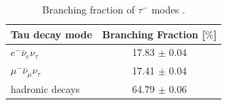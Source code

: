 %  
  \begin{table}[ht]
  \begin{center}
  \begin{tabular}{|l|c|}
    \hline
    Tau decay mode                                          &  Branching Fraction [$\%$]    \\ \hline\hline
    $e^{-}\bar{\nu}_{e}\nu_{\tau}$                          & 17.83 $\pm$ 0.04             \\ \hline
    $\mu^{-}\bar{\nu}_{\mu}\nu_{\tau}$                      & 17.41 $\pm$ 0.04             \\ \hline
    hadronic decays                                         & 64.79 $\pm$ 0.06            \\ \hline
    \hline
  \end{tabular}
  \caption{Branching fraction of $\tau^{-}$ modes \cite{bib:PDG}.} 
  \label{tab:taudecaymodes}  
  \end{center}

  


\end{table}

